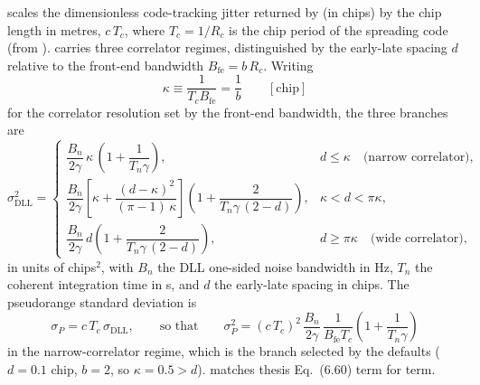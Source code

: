  scales the dimensionless
code-tracking jitter returned by  (in chips) by the chip length
in metres, $c\,T_c$, where $T_c = 1/R_c$ is the chip period of the spreading
code (from ).   carries three correlator
regimes, distinguished by the early-late spacing $d$ relative to the
front-end bandwidth $B_\mathrm{fe} = b\,R_c$.  Writing
\begin{equation}
  \kappa \equiv \frac{1}{T_c B_\mathrm{fe}} = \frac{1}{b}
  \qquad [\text{chip}]
  \label{eq:lb-kappa}
\end{equation}
for the correlator resolution set by the front-end bandwidth, the three
branches are
\begin{equation}
  \sigma_\mathrm{DLL}^2
  =
  \begin{cases}
    \dfrac{B_n}{2\gamma}\,\kappa\,
    \left(1 + \dfrac{1}{T_n \gamma}\right),
      & d \le \kappa
        \quad \text{(narrow correlator)}, \\[3ex]
    \dfrac{B_n}{2\gamma}
    \left[
      \kappa + \dfrac{(d - \kappa)^{2}}{(\pi - 1)\,\kappa}
    \right]
    \left(1 + \dfrac{2}{T_n \gamma\,(2 - d)}\right),
      & \kappa < d < \pi\kappa, \\[3ex]
    \dfrac{B_n}{2\gamma}\, d
    \left(1 + \dfrac{2}{T_n \gamma\,(2 - d)}\right),
      & d \ge \pi\kappa
        \quad \text{(wide correlator)},
  \end{cases}
  \label{eq:lb-sigma-dll}
\end{equation}
in units of chips${}^2$, with $B_n$ the DLL one-sided noise bandwidth in
\si{\hertz}, $T_n$ the coherent integration time in \si{\second}, and $d$ the
early-late spacing in chips.  The pseudorange standard deviation is
\begin{equation}
  \sigma_P
  =
  c\,T_c\,\sigma_\mathrm{DLL},
  \qquad\text{so that}\qquad
  \sigma_P^2
  =
  (c\,T_c)^2\,
  \frac{B_n}{2\gamma}\,
  \frac{1}{B_\mathrm{fe} T_c}
  \left(1 + \frac{1}{T_n \gamma}\right)
  \label{eq:lb-sigma-range}
\end{equation}
in the narrow-correlator regime, which is the branch selected by the \lupnt{}
defaults ($d = 0.1$ chip, $b = 2$, so $\kappa = 0.5 > d$).
 matches thesis Eq.~(6.60) term for term.

